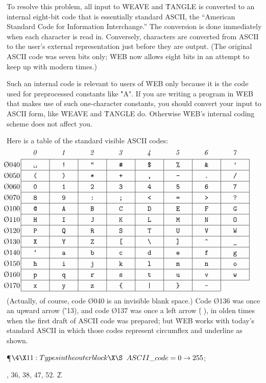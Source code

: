 To resolve this problem, all input to \.{WEAVE} and \.{TANGLE} is
converted to an internal eight-bit code that is essentially standard
ASCII, the ``American Standard Code for Information Interchange.''
The conversion is done immediately when each character is read in.
Conversely, characters are converted from ASCII to the user's external
representation just before they are output. (The original ASCII code
was seven bits only; \.{WEB} now allows eight bits in an attempt to
keep up with modern times.)

Such an internal code is relevant to users of \.{WEB} only because it is
the code used for preprocessed constants like \.{"A"}. If you are writing
a program in \.{WEB} that makes use of such one-character constants, you
should convert your input to ASCII form, like \.{WEAVE} and \.{TANGLE} do.
Otherwise \.{WEB}'s internal coding scheme does not affect you.

Here is a table of the standard visible ASCII codes:
$$\def\:{\char\count255\global\advance\count255 by 1}
\count255='40
\vbox{
\hbox{\hbox to 40pt{\it\hfill0\/\hfill}%
\hbox to 40pt{\it\hfill1\/\hfill}%
\hbox to 40pt{\it\hfill2\/\hfill}%
\hbox to 40pt{\it\hfill3\/\hfill}%
\hbox to 40pt{\it\hfill4\/\hfill}%
\hbox to 40pt{\it\hfill5\/\hfill}%
\hbox to 40pt{\it\hfill6\/\hfill}%
\hbox to 40pt{\it\hfill7\/\hfill}}
\vskip 4pt
\hrule
\def\^{\vrule height 10.5pt depth 4.5pt}
\halign{\hbox to 0pt{\hskip -24pt\O{#0}\hfill}&\^
\hbox to 40pt{\tt\hfill#\hfill\^}&
&\hbox to 40pt{\tt\hfill#\hfill\^}\cr
04&\:&\:&\:&\:&\:&\:&\:&\:\cr\noalign{\hrule}
05&\:&\:&\:&\:&\:&\:&\:&\:\cr\noalign{\hrule}
06&\:&\:&\:&\:&\:&\:&\:&\:\cr\noalign{\hrule}
07&\:&\:&\:&\:&\:&\:&\:&\:\cr\noalign{\hrule}
10&\:&\:&\:&\:&\:&\:&\:&\:\cr\noalign{\hrule}
11&\:&\:&\:&\:&\:&\:&\:&\:\cr\noalign{\hrule}
12&\:&\:&\:&\:&\:&\:&\:&\:\cr\noalign{\hrule}
13&\:&\:&\:&\:&\:&\:&\:&\:\cr\noalign{\hrule}
14&\:&\:&\:&\:&\:&\:&\:&\:\cr\noalign{\hrule}
15&\:&\:&\:&\:&\:&\:&\:&\:\cr\noalign{\hrule}
16&\:&\:&\:&\:&\:&\:&\:&\:\cr\noalign{\hrule}
17&\:&\:&\:&\:&\:&\:&\:\cr}
\hrule width 280pt}$$
(Actually, of course, code \O{040} is an invisible blank space.)  Code \O{136}
was once an upward arrow (\.{\char'13}), and code \O{137} was
once a left arrow (\.^^X), in olden times when the first draft
of ASCII code was prepared; but \.{WEB} works with today's standard
ASCII in which those codes represent circumflex and underline as shown.

\Y\P$\4\X11:Types in the outer block\X\S$\6
$\\{ASCII\_code}=0\to255$;\par
{}, 36, 38, 47, 52.
\U2.\fi

